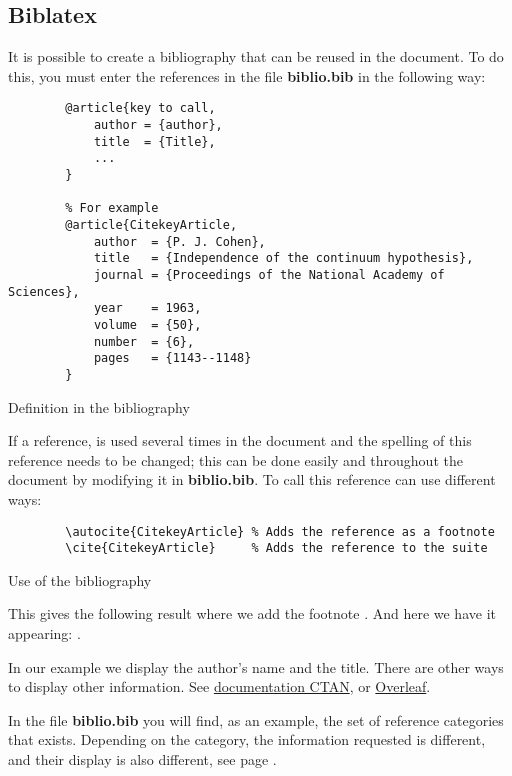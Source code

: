 \subsection{Biblatex} \label{Biblatex}
It is possible to create a bibliography that can be reused in the document.
To do this, you must enter the references in the file \textbf{biblio.bib} in the following way:
\begin{code}
    \begin{verbatim}
        @article{key to call,
            author = {author},
            title  = {Title},
            ...
        }

        % For example
        @article{CitekeyArticle,
            author  = {P. J. Cohen},
            title   = {Independence of the continuum hypothesis},
            journal = {Proceedings of the National Academy of Sciences},
            year    = 1963,
            volume  = {50},
            number  = {6},
            pages   = {1143--1148}
        }
\end{verbatim}
    \caption{Definition in the bibliography}
\end{code}

If a reference, is used several times in the document and the spelling of this reference
needs to be changed; this can be done easily and throughout the document by modifying it in
\textbf{biblio.bib}.
To call this reference can use different ways:
\begin{code}
    \begin{verbatim}
        \autocite{CitekeyArticle} % Adds the reference as a footnote
        \cite{CitekeyArticle}     % Adds the reference to the suite
\end{verbatim}
    \caption{Use of the bibliography}
\end{code}

This gives the following result where we add the footnote \autocite{CitekeyArticle}.
And here we have it appearing: \cite{CitekeyArticle}. \newline

In our example we display the author's name and the title. There are other ways to display other
information. See
\href{https://mirror.ibcp.fr/pub/CTAN/macros/latex/contrib/biblatex/doc/biblatex.pdf}{documentation CTAN},
or \href{https://fr.overleaf.com/learn/latex/Bibliography_management_with_bibtex}{Overleaf}.
\newline

In the file \textbf{biblio.bib} you will find, as an example, the set of reference categories that
exists. Depending on the category, the information requested is different, and their display is also
different, see page \pageref{bibliography}.

